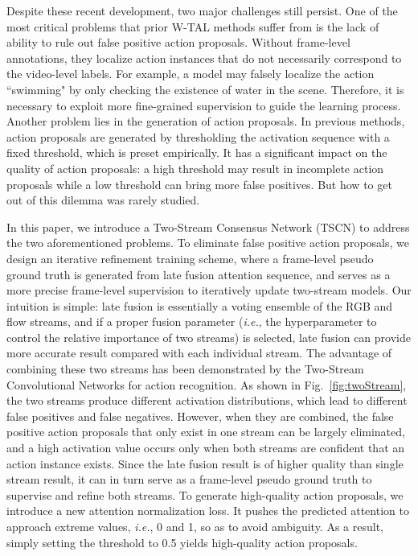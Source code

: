 \documentclass[runningheads]{llncs}
\begin{document}
Despite these recent development, two major challenges still persist. 
One of the most critical problems that prior W-TAL methods suffer from is the lack of ability to rule out false positive action proposals. 
Without frame-level annotations, they localize action instances that do not necessarily correspond to the video-level labels.
For example, a model may falsely localize the action ``swimming" by only checking the existence of water in the scene. Therefore, it is necessary to exploit more fine-grained supervision to guide the learning process.
Another problem lies in the generation of action proposals. 
In previous methods, action proposals are generated by thresholding the activation sequence with a fixed threshold, which is preset empirically.
It has a significant impact on the quality of action proposals: a high threshold may result in incomplete action proposals while a low threshold can bring more false positives. But how to get out of this dilemma was rarely studied.


In this paper, we introduce a Two-Stream Consensus Network (TSCN) to address the two aforementioned problems. 
To eliminate false positive action proposals, we design an iterative refinement training scheme, where a frame-level pseudo ground truth is generated from late fusion attention sequence, and serves as a more precise frame-level supervision to iteratively update two-stream models.
Our intuition is simple: late fusion is essentially a voting ensemble of the RGB and flow streams, and if a proper fusion parameter (\textit{i.e.}, the hyperparameter to control the relative importance of two streams) is selected, late fusion can provide more accurate result compared with each individual stream. 
The advantage of combining these two streams has been demonstrated by the Two-Stream Convolutional Networks \cite{simonyan2014two} for action recognition.
As shown in Fig.~\ref{fig:twoStream}, the two streams produce different activation distributions, which lead to different false positives and false negatives. 
However, when they are combined, the false positive action proposals that only exist in one stream can be largely eliminated, and a high activation value occurs only when both streams are confident that an action instance exists.
Since the late fusion result is of higher quality than single stream result, it can in turn serve as a frame-level pseudo ground truth to supervise and refine both streams.
To generate high-quality action proposals, we introduce a new attention normalization loss. It pushes the predicted attention to approach extreme values, \emph{i.e.}, 0 and 1, so as to avoid ambiguity. As a result, simply setting the threshold to 0.5 yields high-quality action proposals.
\end{document}
